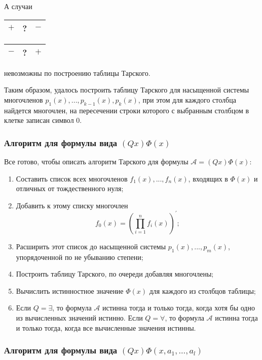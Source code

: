 А случаи
\begin{center}
    \begin{tabular}{|c|c|c|}
        \hline
        $+$ & ? & $-$\\
        \hline
    \end{tabular}
        \quad
    \begin{tabular}{|c|c|c|}
        \hline
        $-$ & ? & $+$\\
        \hline
    \end{tabular}      
\end{center}
невозможны по построению таблицы Тарского.

Таким образом, удалось построить таблицу Тарского для насыщенной системы многочленов $p_1(x), ... , p_{k-1}(x), p_k(x)$, при этом для каждого столбца найдется многочлен, на пересечении строки которого с выбранным столбцом в клетке записан символ $0$.

\subsubsection{Алгоритм для формулы вида $(Qx)\Phi(x)$}

Все готово, чтобы описать алгоритм Тарского для формулы $\mathcal{A} = (Qx)\Phi(x)$:
\begin{enumerate}
    \item Составить список всех многочленов $f_1(x), ... , f_n(x)$, входящих в $\Phi(x)$ и отличных от тождественного нуля;
    \item Добавить к этому списку многочлен 
    \begin{equation*}
        f_0(x) = \left( \prod\limits_{i = 1}^n f_i(x) \right)^\prime;
    \end{equation*}
    \item Расширить этот список до насыщенной системы $p_1(x), ... , p_m(x)$, упорядоченной по не убыванию степени;
    \item Построить таблицу Тарского, по очереди добавляя многочлены; 
    \item Вычислить истинностное значение $\Phi(x)$ для каждого из столбцов таблицы;
    \item Если $Q = \exists$, то формула $\mathcal{A}$ истинна тогда и только тогда, когда хотя бы одно из вычисленных значений истинно. Если $Q = \forall$, то формула $\mathcal{A}$ истинна тогда и только тогда, когда все вычисленные значения истинны.
\end{enumerate}

\subsubsection{Алгоритм для формулы вида $(Qx)\Phi(x, a_1, ... , a_l)$}

